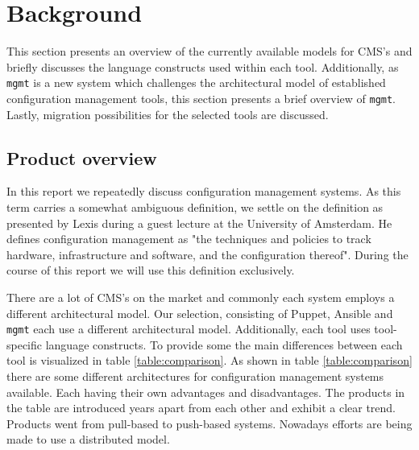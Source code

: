 \section{Background}\label{sec:background}
This section presents an overview of the currently available models for CMS's and briefly discusses the language constructs used within each tool. Additionally, as \texttt{mgmt} is a new system which challenges the architectural model of established configuration management tools, this section presents a brief overview of \texttt{mgmt}. Lastly, migration possibilities for the selected tools are discussed.

\subsection{Product overview}
In this report we repeatedly discuss configuration management systems. As this term carries a somewhat ambiguous definition, we settle on the definition as presented by Lexis \cite{lexis_2016} during a guest lecture at the University of Amsterdam. He defines configuration management as "the techniques and policies to track hardware, infrastructure and software, and the configuration thereof". During the course of this report we will use this definition exclusively.

There are a lot of CMS's on the market and commonly each system employs a different architectural model. Our selection, consisting of Puppet, Ansible and \texttt{mgmt} each use a different architectural model. Additionally, each tool uses tool-specific language constructs. To provide some the main differences between each tool is visualized in table \ref{table:comparison}. As shown in table \ref{table:comparison} there are some different architectures for configuration management systems available. Each having their own advantages and disadvantages. The products in the table are introduced years apart from each other and exhibit a clear trend. Products went from pull-based to push-based systems. Nowadays efforts are being made to use a distributed model.

